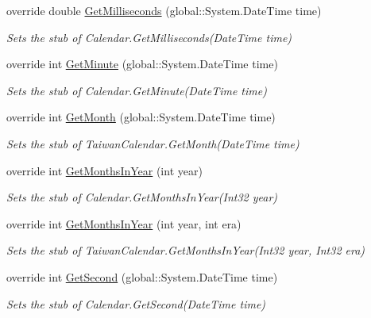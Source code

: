 \begin{DoxyCompactItemize}
override double \hyperlink{class_system_1_1_globalization_1_1_fakes_1_1_stub_taiwan_calendar_a07774c4167d000333b68d897bff56305}{Get\-Milliseconds} (global\-::\-System.\-Date\-Time time)
\begin{DoxyCompactList}\small\item\em Sets the stub of Calendar.\-Get\-Milliseconds(\-Date\-Time time)\end{DoxyCompactList}\item 
override int \hyperlink{class_system_1_1_globalization_1_1_fakes_1_1_stub_taiwan_calendar_a747058c04b5f77f6c5869abc56676f40}{Get\-Minute} (global\-::\-System.\-Date\-Time time)
\begin{DoxyCompactList}\small\item\em Sets the stub of Calendar.\-Get\-Minute(\-Date\-Time time)\end{DoxyCompactList}\item 
override int \hyperlink{class_system_1_1_globalization_1_1_fakes_1_1_stub_taiwan_calendar_aaeaa09052172c2706069598d231eb36b}{Get\-Month} (global\-::\-System.\-Date\-Time time)
\begin{DoxyCompactList}\small\item\em Sets the stub of Taiwan\-Calendar.\-Get\-Month(\-Date\-Time time)\end{DoxyCompactList}\item 
override int \hyperlink{class_system_1_1_globalization_1_1_fakes_1_1_stub_taiwan_calendar_a312a0beb4794cc921eb5b8c42209b344}{Get\-Months\-In\-Year} (int year)
\begin{DoxyCompactList}\small\item\em Sets the stub of Calendar.\-Get\-Months\-In\-Year(\-Int32 year)\end{DoxyCompactList}\item 
override int \hyperlink{class_system_1_1_globalization_1_1_fakes_1_1_stub_taiwan_calendar_a924b7854f1b6d05f08c015151b5152a0}{Get\-Months\-In\-Year} (int year, int era)
\begin{DoxyCompactList}\small\item\em Sets the stub of Taiwan\-Calendar.\-Get\-Months\-In\-Year(\-Int32 year, Int32 era)\end{DoxyCompactList}\item 
override int \hyperlink{class_system_1_1_globalization_1_1_fakes_1_1_stub_taiwan_calendar_ae4eb2daaf13eac80e621e4e3b47656ca}{Get\-Second} (global\-::\-System.\-Date\-Time time)
\begin{DoxyCompactList}\small\item\em Sets the stub of Calendar.\-Get\-Second(\-Date\-Time time)\end{DoxyCompactList}\item 

\end{DoxyCompactItemize}
